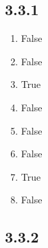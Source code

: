 \documentclass[12pt,titlepage]{extarticle}
\begin{document}
\subsection*{3.3.1}
\begin{enumerate}[label=\alph*)]
    \item False
    \item False
    \item True
    \item False
    \item False
    \item False
    \item True
    \item False
\end{enumerate}

\subsection*{3.3.2}
\end{document}
